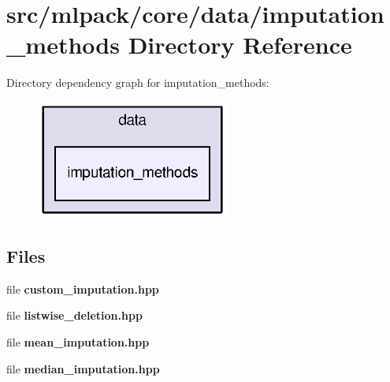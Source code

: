 \section{src/mlpack/core/data/imputation\+\_\+methods Directory Reference}
\label{dir_199a51b2d898abcb68f0ab4545dd316d}
Directory dependency graph for imputation\+\_\+methods\+:
\nopagebreak
\begin{figure}[H]
\begin{center}
\leavevmode
\includegraphics[width=180pt]{dir_199a51b2d898abcb68f0ab4545dd316d_dep}
\end{center}
\end{figure}
\subsection*{Files}
\begin{DoxyCompactItemize}
\item 
file {\bf custom\+\_\+imputation.\+hpp}
\item 
file {\bf listwise\+\_\+deletion.\+hpp}
\item 
file {\bf mean\+\_\+imputation.\+hpp}
\item 
file {\bf median\+\_\+imputation.\+hpp}
\end{DoxyCompactItemize}
